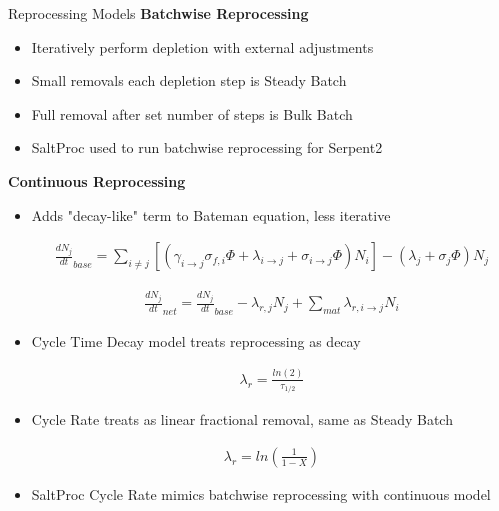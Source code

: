 \documentclass[final]{beamer}
\newlength{\onecolwid}
\newlength{\threecolwid}
\begin{document}
\begin{frame}[t]
\begin{columns}[t,totalwidth=\threecolwid]
\begin{column}{\onecolwid}
\begin{block}{Reprocessing Models}
\vspace{0.7em}
\textbf{Batchwise Reprocessing}

\begin{itemize}
        \item Iteratively perform depletion with external adjustments
	\item Small removals each depletion step is Steady Batch
	\item Full removal after set number of steps is Bulk Batch
	\item SaltProc used to run batchwise reprocessing for Serpent2
\end{itemize}

\vspace{0.7em}
\textbf{Continuous Reprocessing}

\begin{itemize}
	\item Adds "decay-like" term to Bateman equation, less iterative \cite{aufiero_extended_2013}

\begin{align*}
\frac{dN_j}{dt}_{base} = \sum_{i \neq j}  \left [ \left( \gamma_{i \rightarrow j} \sigma_{f, i} \Phi + \lambda _{i \rightarrow j} + \sigma_{i \rightarrow j} \Phi \right) N_i \right ] - \left ( \lambda_j + \sigma_j \Phi \right ) N_j
\end{align*}

\begin{align*}	
\frac{dN_j}{dt}_{net} = \frac{dN_j}{dt}_{base} -  \lambda_{r, j} N_j + \sum_{mat} \lambda _{r, i \rightarrow j} N_i
\end{align*}
	\item Cycle Time Decay model treats reprocessing as decay

\begin{align*}
	\lambda_r = \frac{ln(2)}{\tau_{1/2}}
\end{align*}

	\item Cycle Rate treats as linear fractional removal, same as Steady Batch

\begin{align*}
	\lambda_r = ln \left( \frac{1}{1-X} \right)
\end{align*}
	\item SaltProc Cycle Rate mimics batchwise reprocessing with continuous model
\end{itemize}





\end{block}
\end{column}
\end{columns}
\end{frame}
\end{document}
